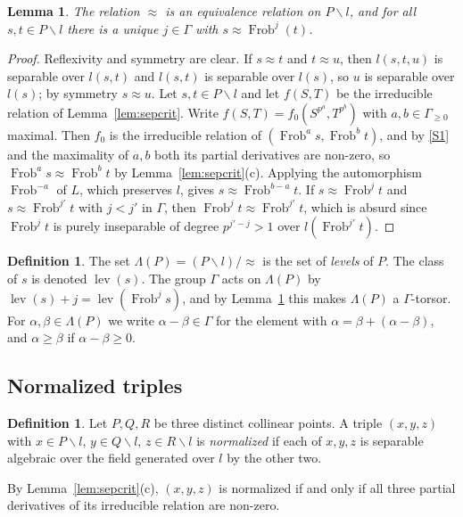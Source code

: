 \documentclass[11pt]{amsart}
\newtheorem{lemma}[theorem]{Lemma}
\theoremstyle{definition}
\newtheorem{definition}[theorem]{Definition}
\theoremstyle{remark}
\newcommand{\Frob}{\operatorname{Frob}}
\newcommand{\lev}{\operatorname{lev}}
\newcommand{\sm}{\smallsetminus}
\begin{document}
\begin{lemma}\label{lem:levels}
The relation $\approx$ is an equivalence relation on $P\sm l$, and for all $s,t\in P\sm l$ there is a unique $j\in\Gamma$ with $s\approx\Frob^j(t)$.
\end{lemma}

\begin{proof}
Reflexivity and symmetry are clear. If $s\approx t$ and $t\approx u$, then $l(s,t,u)$ is separable over $l(s,t)$ and $l(s,t)$ is separable over $l(s)$, so $u$ is separable over $l(s)$;
by symmetry $s\approx u$.
Let $s,t\in P\sm l$ and let $f(S,T)$ be the irreducible relation of Lemma~\ref{lem:sepcrit}. Write $f(S,T)=f_0(S^{p^a},T^{p^b})$ with $a,b\in\Gamma_{\ge0}$ maximal. Then $f_0$ is the irreducible relation
of $(\Frob^as,\Frob^bt)$, and by \ref{S1} and the maximality of $a,b$ both its partial derivatives are non-zero, so $\Frob^as\approx\Frob^bt$ by Lemma~\ref{lem:sepcrit}(c).
Applying the automorphism $\Frob^{-a}$ of $L$, which preserves $l$, gives $s\approx\Frob^{b-a}t$.
If $s\approx\Frob^jt$ and $s\approx\Frob^{j'}t$ with $j<j'$ in $\Gamma$, then $\Frob^jt\approx\Frob^{j'}t$, which is absurd since $\Frob^jt$ is purely inseparable of degree $p^{j'-j}>1$ over $l(\Frob^{j'}t)$.
\end{proof}

\begin{definition}
The set $\Lambda(P)=(P\sm l)/{\approx}$ is the set of \emph{levels} of $P$. The class of $s$ is denoted $\lev(s)$. The group $\Gamma$ acts on $\Lambda(P)$ by
$\lev(s)+j=\lev(\Frob^js)$, and by Lemma~\ref{lem:levels} this makes $\Lambda(P)$ a $\Gamma$-torsor. For $\alpha,\beta\in\Lambda(P)$ we write $\alpha-\beta\in\Gamma$ for the
element with $\alpha=\beta+(\alpha-\beta)$, and $\alpha\ge\beta$ if $\alpha-\beta\geq0$.
\end{definition}

\subsection{Normalized triples}

\begin{definition}
Let $P,Q,R$ be three distinct collinear points. A triple $(x,y,z)$ with $x\in P\sm l$, $y\in Q\sm l$, $z\in R\sm l$ is \emph{normalized}
if each of $x,y,z$ is separable algebraic over the field generated over $l$ by the other two.
\end{definition}

By Lemma~\ref{lem:sepcrit}(c), $(x,y,z)$ is normalized if and only if all three partial derivatives of its irreducible relation are non-zero.
\end{document}
